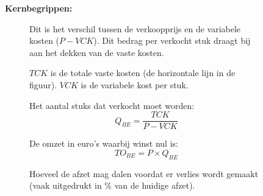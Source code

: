 \documentclass[a4paper,11pt]{article}
\begin{document}
          \begin{figure}[ht]
              \centering
              \begin{minipage}{0.45\textwidth}
                  \textbf{Kernbegrippen:}
                  \begin{description}
                      \item[] Dit is het verschil tussen de verkoopprijs en de variabele kosten ($P - VCK$). Dit bedrag per verkocht stuk draagt bij aan het dekken van de vaste kosten.
                      \item[] $TCK$ is de totale vaste kosten (de horizontale lijn in de figuur). $VCK$ is de variabele kost per stuk.
                      \item[] Het aantal stuks dat verkocht moet worden:
                            \[ Q_{BE} = \frac{TCK}{P - VCK} \]
                      \item[] De omzet in euro's waarbij winst nul is:
                            \[ TO_{BE} = P \times Q_{BE} \]
                      \item[] Hoeveel de afzet mag dalen voordat er verlies wordt gemaakt (vaak uitgedrukt in \% van de huidige afzet).
                  \end{description}
              \end{minipage}%
              \hfill
              \begin{minipage}{0.5\textwidth}
                  \centering
\end{minipage}
\end{figure}
\end{document}
